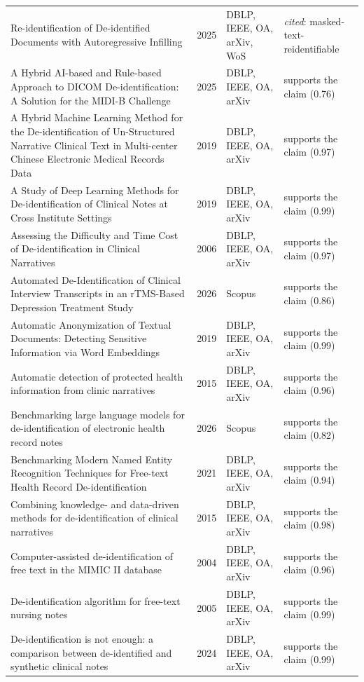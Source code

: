 \begin{longtable}{@{}%
  >{\raggedright\arraybackslash}p{}c%
  >{\raggedright\arraybackslash}p{}%
  >{\raggedright\arraybackslash}p{}@{}}
Re-identification of De-identified Documents with Autoregressive Infilling & 2025 & DBLP, IEEE, OA, arXiv, WoS & \emph{cited}: masked-text-reidentifiable \\
A Hybrid AI-based and Rule-based Approach to DICOM De-identification: A Solution for the MIDI-B Challenge & 2025 & DBLP, IEEE, OA, arXiv & supports the claim (0.76) \\
A Hybrid Machine Learning Method for the De-identification of Un-Structured Narrative Clinical Text in Multi-center Chinese Electronic Medical Records Data & 2019 & DBLP, IEEE, OA, arXiv & supports the claim (0.97) \\
A Study of Deep Learning Methods for De-identification of Clinical Notes at Cross Institute Settings & 2019 & DBLP, IEEE, OA, arXiv & supports the claim (0.99) \\
Assessing the Difficulty and Time Cost of De-identification in Clinical Narratives & 2006 & DBLP, IEEE, OA, arXiv & supports the claim (0.97) \\
Automated De-Identification of Clinical Interview Transcripts in an rTMS-Based Depression Treatment Study & 2026 & Scopus & supports the claim (0.86) \\
Automatic Anonymization of Textual Documents: Detecting Sensitive Information via Word Embeddings & 2019 & DBLP, IEEE, OA, arXiv & supports the claim (0.99) \\
Automatic detection of protected health information from clinic narratives & 2015 & DBLP, IEEE, OA, arXiv & supports the claim (0.96) \\
Benchmarking large language models for de-identification of electronic health record notes & 2026 & Scopus & supports the claim (0.82) \\
Benchmarking Modern Named Entity Recognition Techniques for Free-text Health Record De-identification & 2021 & DBLP, IEEE, OA, arXiv & supports the claim (0.94) \\
Combining knowledge- and data-driven methods for de-identification of clinical narratives & 2015 & DBLP, IEEE, OA, arXiv & supports the claim (0.98) \\
Computer-assisted de-identification of free text in the MIMIC II database & 2004 & DBLP, IEEE, OA, arXiv & supports the claim (0.96) \\
De-identification algorithm for free-text nursing notes & 2005 & DBLP, IEEE, OA, arXiv & supports the claim (0.99) \\
De-identification is not enough: a comparison between de-identified and synthetic clinical notes & 2024 & DBLP, IEEE, OA, arXiv & supports the claim (0.99) \\

\end{longtable}
